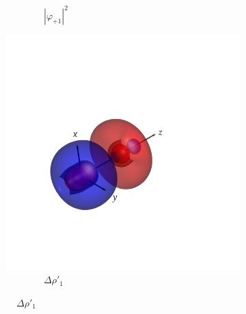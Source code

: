 \documentclass[journal=inoraj,manuscript=article]{achemso}
\begin{document}
\begin{figure}[!h]
\begin{subfigure}[t]{0.32\textwidth}
        \caption*{\ \ \ \ \ \ \ \ $|\varphi_{+1}|^2$} 
    \end{subfigure}
    \hfill
    \begin{subfigure}[t]{0.32\textwidth}
        \centering
        \includegraphics[width=\linewidth]{./AuPb+/pair1.png} 
        \caption*{\ \ \ \ \ \ \ \ $\Delta \rho'_1$} 
    \end{subfigure}


\end{figure}
\end{document}
